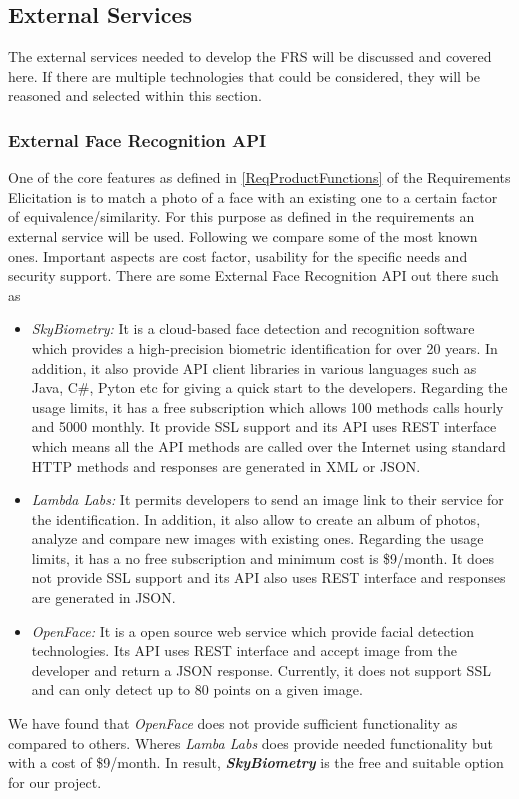 \documentclass[a4paper,11pt]{article}
\begin{document}
\subsection{External Services}
The external services needed to develop the FRS will be discussed and covered here. If there are multiple technologies that could be considered, they will be reasoned and selected within this section. 

\subsubsection{External Face Recognition API}
One of the core features as defined in \ref{ReqProductFunctions} of the Requirements Elicitation is to match a photo of a face with an existing one to a certain factor of equivalence/similarity. For this purpose as defined in the requirements an external service will be used. Following we compare some of the most known ones. Important aspects are cost factor, usability for the specific needs and security support.
There are some External Face Recognition API out there such as
\begin{itemize}
\item \emph{SkyBiometry: } It is a cloud-based face detection and recognition software which provides a high-precision biometric identification for over 20 years. In addition, it also provide API client libraries in various languages such as Java, C\#, Pyton etc for giving a quick start to the developers. Regarding the usage limits, it has a free subscription which allows 100 methods calls hourly and 5000 monthly. It provide SSL support and its API uses REST interface which means all the API methods are called over the Internet using standard HTTP methods and responses are generated in XML or JSON.
\item \emph{Lambda Labs: } It permits developers to send an image link to their service for the identification. In addition, it also allow to create an album of photos, analyze and compare new images with existing ones. Regarding the usage limits, it has a no free subscription and minimum cost is \$9/month. It does not provide SSL support and its API also uses REST interface and responses are generated in JSON.
\item \emph{OpenFace: } It is a open source web service which provide facial detection technologies. Its API uses REST interface and accept image from the developer and return a JSON response. Currently, it does not support SSL and can only detect up to 80 points on a given image.
\end{itemize}
We have found that \emph{OpenFace} does not provide sufficient functionality as compared to others. Wheres \emph{Lamba Labs} does provide needed functionality but with a cost of \$9/month. In result, \emph{\textbf{SkyBiometry}} is the free and suitable option for our project.
\end{document}
